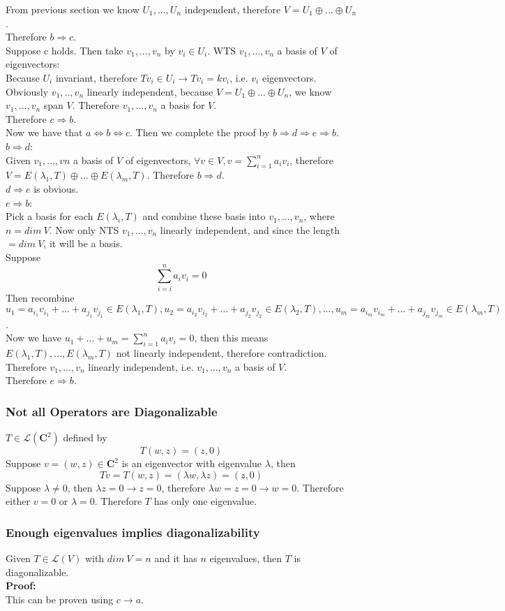 \documentclass{article}
\begin{document}
From previous section we know $U_1, ..., U_n$ independent, therefore $V = U_1 \oplus ... \oplus U_n$.\\
Therefore $b \Rightarrow c$.\\
Suppose c holds. Then take $v_1, ..., v_n$ by $v_i \in U_i$. WTS $v_1, ..., v_n$ a basis of $V$ of eigenvectors:\\
Because $U_i$ invariant, therefore $Tv_i \in U_i \rightarrow Tv_i = kv_i$, i.e. $v_i$ eigenvectors. Obviously $v_1, .., v_n$ linearly independent, because $V = U_1 \oplus ... \oplus U_n$, we know $v_1, ..., v_n$ span $V$. Therefore $v_1, ..., v_n$ a basis for $V$.\\
Therefore $c \Rightarrow b$.\\
Now we have that $a \iff b \iff c$. Then we complete the proof by $b \Rightarrow d \Rightarrow e \Rightarrow b$.\\
$b \Rightarrow d$:\\
Given $v_1, ..., vn$ a basis of $V$ of eigenvectors, $\forall v \in V, v = \sum_{i=1}^{n}a_iv_i$, therefore $V = E(\lambda_1, T) \oplus ... \oplus E(\lambda_m, T)$. Therefore $b \Rightarrow d$.\\
$d \Rightarrow e$ is obvious.\\
$e \Rightarrow b$:\\
Pick a basis for each $E(\lambda_i, T)$ and combine these basis into $v_1, ..., v_n$, where $n = dim\ V$. Now only NTS $v_1, ..., v_n$ linearly independent, and since the length $=dim\ V$, it will be a basis.\\
Suppose
\begin{equation*}
    \sum_{i=i}^{n} a_iv_i = 0
\end{equation*}
Then recombine $u_1 = a_{i_1}v_{i_1} + ... + a_{j_1}v_{j_1} \in E(\lambda_1, T), u_2 = a_{i_2}v_{i_2} + ... + a_{j_2}v_{j_2} \in E(\lambda_2, T), ..., u_m = a_{i_m}v_{i_m} + ... + a_{j_m}v_{j_m} \in E(\lambda_m, T)$.\\
Now we have $u_1 + ... + u_m = \sum_{i=1}^{n} a_iv_i = 0$, then this means $E(\lambda_1,T), ..., E(\lambda_m, T)$ not linearly independent, therefore contradiction. Therefore $v_1, ..., v_n$ linearly independent, i.e. $v_1, ..., v_n$ a basis of $V$.\\
Therefore $e \Rightarrow b$.
\subsubsection{Not all Operators are Diagonalizable}
$T \in \mathcal{L}(\mathbf{C}^2)$ defined by
\begin{equation*}
    T(w, z) = (z, 0)
\end{equation*}
Suppose $v = (w, z) \in \mathbf{C}^2$ is an eigenvector with eigenvalue $\lambda$, then
\begin{equation*}
    Tv = T(w, z) = (\lambda w, \lambda z) = (z, 0)
\end{equation*}
Suppose $\lambda \neq 0$, then $\lambda z = 0 \rightarrow z = 0$, therefore $\lambda w = z = 0 \rightarrow w = 0$. Therefore either $v = 0$ or $\lambda = 0$. Therefore $T$ has only one eigenvalue.
\subsubsection{Enough eigenvalues implies diagonalizability}
Given $T \in \mathcal{L}(V)$ with $dim\ V = n$ and it has $n$ eigenvalues, then $T$ is diagonalizable.\\
\textbf{Proof:}\\
This can be proven using $c \rightarrow a$.
\end{document}
